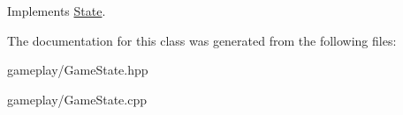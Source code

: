 \-Implements \hyperlink{classState_acd5926bc7a373edff9e57f3ffe94ca13_acd5926bc7a373edff9e57f3ffe94ca13}{\-State}.



\-The documentation for this class was generated from the following files\-:\begin{DoxyCompactItemize}
\item 
gameplay/\-Game\-State.\-hpp\item 
gameplay/\-Game\-State.\-cpp\end{DoxyCompactItemize}
